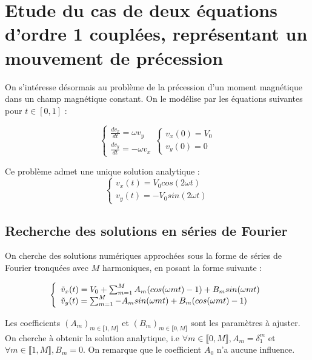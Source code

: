 \documentclass{article}
\begin{document}
\section{Etude du cas de deux équations d'ordre 1 couplées, représentant un mouvement de précession}
On s'intéresse désormais au problème de la précession d'un moment magnétique dans un champ magnétique constant. On le modélise par les équations suivantes pour $t\in [0,1]$ :

\begin{equation}
\left\{
    \begin{array}{ll}
        \frac{dv_x}{dt} = \omega v_y \\
        \frac{dv_y}{dt} = -\omega v_x
    \end{array}
\right.
\left\{
    \begin{array}{ll}
        v_x(0) = V_0 \\
        v_y(0) = 0
    \end{array}
\right.
\label{eq:équations couplées}
\end{equation}

Ce problème admet une unique solution analytique :
\begin{equation}
\left\{
    \begin{array}{ll}
        v_x(t) = V_0 cos(2\omega t) \\
        v_y(t) = -V_0 sin(2\omega t)
    \end{array}
\right.
\label{eq:solution analytique couplée}
\end{equation}

\subsection{Recherche des solutions en séries de Fourier}
On cherche des solutions numériques approchées sous la forme de séries de Fourier tronquées avec $M$ harmoniques, en posant la forme suivante :

\begin{equation}
\left\{
    \begin{array}{ll}
        \Tilde{v}_x(t) = V_0 + \sum_{m=1}^{M} A_m (cos(\omega m t)-1) + B_m sin(\omega m t) \\
        \Tilde{v}_y(t) = \sum_{m=1}^{M} -A_m sin(\omega m t) + B_m (cos(\omega m t)-1)
    \end{array}
\right.
\label{eq:solution Fourier couplée}
\end{equation}

Les coefficients $(A_m)_{m\in \llbracket 1,M \rrbracket}$ et $(B_m)_{m\in \llbracket 0,M \rrbracket}$ sont les paramètres à ajuster.
On cherche à obtenir la solution analytique, i.e $\forall m \in\llbracket 0,M \rrbracket, A_m = \delta _1 ^m $ et $\forall m \in\llbracket 1,M \rrbracket, B_m = 0 $. On remarque que le coefficient $A_0$ n'a aucune influence.
\end{document}
